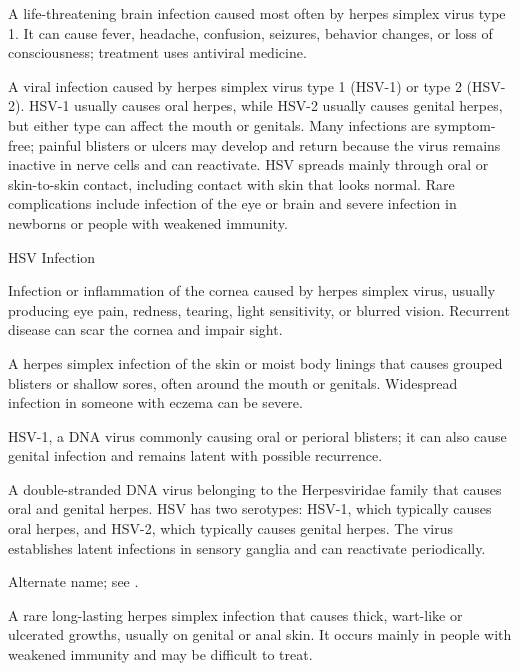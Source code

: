  A life-threatening brain infection caused most often by herpes simplex virus type 1. It can cause fever, headache, confusion, seizures, behavior changes, or loss of consciousness; treatment uses antiviral medicine.

 A viral infection caused by herpes simplex virus type 1 (HSV-1) or type 2 (HSV-2). HSV-1 usually causes oral herpes, while HSV-2 usually causes genital herpes, but either type can affect the mouth or genitals. Many infections are symptom-free; painful blisters or ulcers may develop and return because the virus remains inactive in nerve cells and can reactivate. HSV spreads mainly through oral or skin-to-skin contact, including contact with skin that looks normal. Rare complications include infection of the eye or brain and severe infection in newborns or people with weakened immunity.

\synonyms
HSV Infection

 Infection or inflammation of the cornea caused by herpes simplex virus, usually producing eye pain, redness, tearing, light sensitivity, or blurred vision. Recurrent disease can scar the cornea and impair sight.

 A herpes simplex infection of the skin or moist body linings that causes grouped blisters or shallow sores, often around the mouth or genitals. Widespread infection in someone with eczema can be severe.

 HSV-1, a DNA virus commonly causing oral or perioral blisters; it can also cause genital infection and remains latent with possible recurrence.

 A double-stranded DNA virus belonging to the Herpesviridae family that causes oral and
genital herpes. HSV has two serotypes: HSV-1, which typically causes oral herpes, and
HSV-2, which typically causes genital herpes. The virus establishes latent infections in
sensory ganglia and can reactivate periodically.

 Alternate name; see .

 A rare long-lasting herpes simplex infection that causes thick, wart-like or ulcerated growths, usually on genital or anal skin. It occurs mainly in people with weakened immunity and may be difficult to treat.

